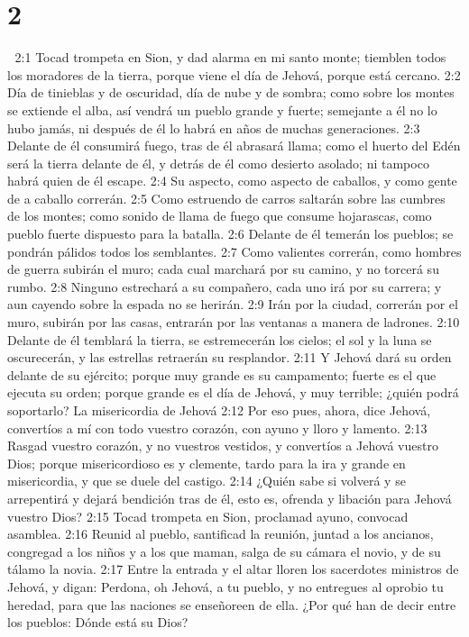 \chapter{2}


2:1 Tocad trompeta en Sion, y dad alarma en mi santo monte; tiemblen todos los moradores de la tierra, porque viene el día de Jehová, porque está cercano.  
2:2 Día de tinieblas y de oscuridad, día de nube y de sombra; como sobre los montes se extiende el alba, así vendrá un pueblo grande y fuerte; semejante a él no lo hubo jamás, ni después de él lo habrá en años de muchas generaciones.  
2:3 Delante de él consumirá fuego, tras de él abrasará llama; como el huerto del Edén será la tierra delante de él, y detrás de él como desierto asolado; ni tampoco habrá quien de él escape.  
2:4 Su aspecto, como aspecto de caballos, y como gente de a caballo correrán.  
2:5 Como estruendo de carros saltarán sobre las cumbres de los montes; como sonido de llama de fuego que consume hojarascas, como pueblo fuerte dispuesto para la batalla. 
2:6 Delante de él temerán los pueblos; se pondrán pálidos todos los semblantes.  
2:7 Como valientes correrán, como hombres de guerra subirán el muro; cada cual marchará por su camino, y no torcerá su rumbo.  
2:8 Ninguno estrechará a su compañero, cada uno irá por su carrera; y aun cayendo sobre la espada no se herirán.  
2:9 Irán por la ciudad, correrán por el muro, subirán por las casas, entrarán por las ventanas a manera de ladrones.  
2:10 Delante de él temblará la tierra, se estremecerán los cielos; el sol y la luna se oscurecerán, y las estrellas retraerán su resplandor. 
2:11 Y Jehová dará su orden delante de su ejército; porque muy grande es su campamento; fuerte es el que ejecuta su orden; porque grande es el día de Jehová, y muy terrible; ¿quién podrá soportarlo?   
La misericordia de Jehová  
2:12 Por eso pues, ahora, dice Jehová, convertíos a mí con todo vuestro corazón, con ayuno y lloro y lamento.  
2:13 Rasgad vuestro corazón, y no vuestros vestidos, y convertíos a Jehová vuestro Dios; porque misericordioso es y clemente, tardo para la ira y grande en misericordia, y que se duele del castigo.  
2:14 ¿Quién sabe si volverá y se arrepentirá y dejará bendición tras de él, esto es, ofrenda y libación para Jehová vuestro Dios?  
2:15 Tocad trompeta en Sion, proclamad ayuno, convocad asamblea.  
2:16 Reunid al pueblo, santificad la reunión, juntad a los ancianos, congregad a los niños y a los que maman, salga de su cámara el novio, y de su tálamo la novia.  
2:17 Entre la entrada y el altar lloren los sacerdotes ministros de Jehová, y digan: Perdona, oh Jehová, a tu pueblo, y no entregues al oprobio tu heredad, para que las naciones se enseñoreen de ella. ¿Por qué han de decir entre los pueblos: Dónde está su Dios?  
